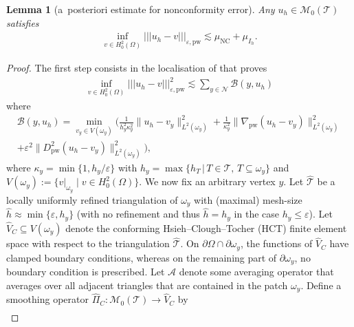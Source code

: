 \documentclass[a4paper]{amsart}
\newtheorem{lemma}[theorem]{Lemma}
\theoremstyle{definition}
\numberwithin{equation}{section}
\numberwithin{theorem}{section}
\newcommand{\pw}{\mathrm{pw}}
\newcommand{\nc}{\mathrm{NC}}
\newcommand{\tri}{\mathcal{T}}
\newcommand{\ennorm}[1]{\lvert\!\lvert\!\lvert #1 \rvert\!\rvert\!\rvert}
\begin{document}
\begin{lemma}[a~posteriori estimate for nonconformity error]
    \label{l:sp_nc_estimator}
    Any $u_h\in\mathcal{M}_0(\tri)$ satisfies 
    \begin{align*}
        \inf_{v\in H^2_0(\Omega)} \ennorm{u_h-v}_{\varepsilon,\pw}
        \lesssim \mu_\nc + \mu_{I_h}.
    \end{align*}
\end{lemma}

\begin{proof}
    The first step consists in the localisation of 
    \cite[Lemma~3.4]{GallistlTian2024} that proves 
    \begin{align*}
        \inf_{v\in H^2_0(\Omega)} \ennorm{u_h-v}_{\varepsilon,\pw}^2
        \lesssim \sum_{y\in \mathcal{N}} 
         \mathcal B(y,u_h)
    \end{align*}
   where
   \begin{align*}
     \mathcal B(y,u_h)=
          \min_{v_y\in V(\omega_y)}
          \Bigg( \frac{1}{h_y^2 \kappa_y^2} 
                    \lVert u_h-v_y\rVert_{L^2(\omega_y)}^2
              +\frac{1}{\kappa_y^2} 
                  \lVert\nabla_\pw(u_h-v_y)\rVert_{L^2(\omega_y)}^2\\
             +\varepsilon^2 
                  \lVert D^2_\pw (u_h-v_y)\rVert_{L^2(\omega_y)}^2
            \Bigg),
    \end{align*}
    where $\kappa_y=\min\{1,h_y/\varepsilon\}$ with 
    $h_y=\max\{h_T\,\vert\,T\in\tri,\, T\subseteq \omega_y\}$ and 
    $V(\omega_y):=\{v\vert_{\omega_y}\;\vert\; v\in H^2_0(\Omega)\}$.
    We now fix an arbitrary vertex $y$.
    Let $\hat{\tri}$ be a locally uniformly refined triangulation of $\omega_y$ with 
    (maximal) mesh-size $\hat{h}\approx \min\{\varepsilon,h_y\}$
    (with no refinement and thus $\hat h = h_y$ in the case $h_y\leq\varepsilon$).
    Let $\hat{V}_C\subseteq V(\omega_y)$ denote the conforming 
    Hsieh--Clough--Tocher (HCT)
    finite element space \cite{Ciarlet1978} with respect to the triangulation 
    $\hat{\tri}$. On $\partial\Omega\cap\partial\omega_y$,
    the functions of $\hat{V}_C$ have clamped boundary conditions,
    whereas on the remaining part of $\partial\omega_y$, no boundary
    condition is prescribed.
    Let $\mathcal{A}$ denote some averaging operator that
    averages over all adjacent triangles that are contained
    in the patch $\omega_y$.
    Define a smoothing operator
    $\hat{\Pi}_C:\mathcal{M}_0(\tri)\to \hat{V}_C$ by 
    \begin{align*}

\end{align*}
\end{proof}
\end{document}
